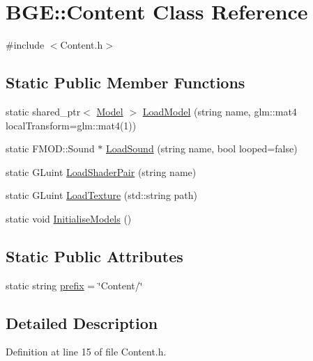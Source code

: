 \hypertarget{class_b_g_e_1_1_content}{\section{B\-G\-E\-:\-:Content Class Reference}
\label{class_b_g_e_1_1_content}
}


{\ttfamily \#include $<$Content.\-h$>$}

\subsection*{Static Public Member Functions}
\begin{DoxyCompactItemize}
\item 
static shared\-\_\-ptr$<$ \hyperlink{class_b_g_e_1_1_model}{Model} $>$ \hyperlink{class_b_g_e_1_1_content_a593266376a259eacb7ebddfc71ee082a}{Load\-Model} (string name, glm\-::mat4 local\-Transform=glm\-::mat4(1))
\item 
static F\-M\-O\-D\-::\-Sound $\ast$ \hyperlink{class_b_g_e_1_1_content_ae02d851bd6f9015ac3af2aece2ab3ad9}{Load\-Sound} (string name, bool looped=false)
\item 
static G\-Luint \hyperlink{class_b_g_e_1_1_content_a449789b41e8d4c4b20cf3d53c55c5420}{Load\-Shader\-Pair} (string name)
\item 
static G\-Luint \hyperlink{class_b_g_e_1_1_content_a05b995e5b7946e7d2b1bbd5da0b8a654}{Load\-Texture} (std\-::string path)
\item 
static void \hyperlink{class_b_g_e_1_1_content_a7af4c8882dba7ee671947e6f269b70bf}{Initialise\-Models} ()
\end{DoxyCompactItemize}
\subsection*{Static Public Attributes}
\begin{DoxyCompactItemize}
\item 
static string \hyperlink{class_b_g_e_1_1_content_ac1da65c14f9baed06379af4bb43a7236}{prefix} = \char`\"{}Content/\char`\"{}
\end{DoxyCompactItemize}


\subsection{Detailed Description}


Definition at line 15 of file Content.\-h.



